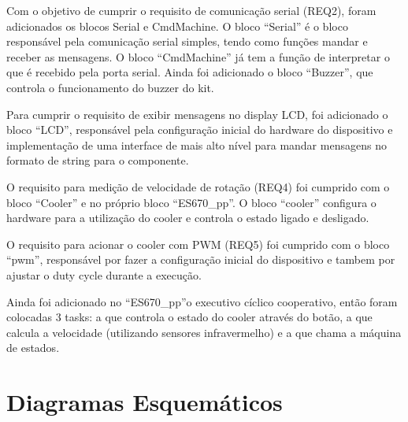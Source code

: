 \documentclass{article}
\begin{document}
Com o objetivo de cumprir o requisito de comunicação serial (REQ2), foram adicionados os blocos Serial e CmdMachine. O bloco ``Serial'' é o bloco responsável pela comunicação serial simples, tendo como funções mandar e receber as mensagens. O bloco ``CmdMachine'' já tem a função de interpretar o que é recebido pela porta serial. Ainda foi adicionado o bloco ``Buzzer'', que controla o funcionamento do buzzer do kit.

Para cumprir o requisito de exibir mensagens no display LCD, foi adicionado o bloco ``LCD'', responsável pela configuração inicial do hardware do dispositivo e implementação de uma interface de mais alto nível para mandar mensagens no formato de string para o componente.

O requisito para medição de velocidade de rotação (REQ4) foi cumprido com o bloco ``Cooler'' e no próprio bloco ``ES670\_pp''. O bloco ``cooler'' configura o hardware para a utilização do cooler e controla o estado ligado e desligado.

O requisito para acionar o cooler com PWM (REQ5) foi cumprido com o bloco ``pwm'', responsável por fazer a configuração inicial do dispositivo e tambem por ajustar o duty cycle durante a execução.

Ainda foi adicionado no ``ES670\_pp''o executivo cíclico cooperativo, então foram colocadas 3 tasks: a que controla o estado do cooler através do botão, a que calcula a velocidade (utilizando sensores infravermelho) e a que chama a máquina de estados.

\section{Diagramas Esquemáticos}
\end{document}
